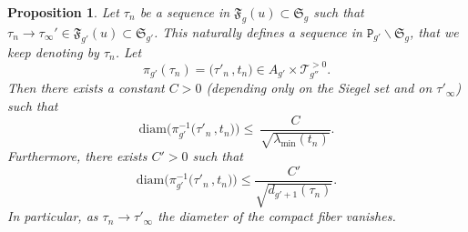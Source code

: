 \documentclass[10pt,a4paper]{amsart}
\newtheorem{proposition}{Proposition}
\newcommand{\cT}[1]{\mathscr{T}_{#1}^{\scriptscriptstyle{>0}}}
\newcommand{\diam}{\mathrm{diam}}
\newcommand{\fF}{\mathfrak{F}}
\newcommand{\fS}{\mathfrak{S}}
\newcommand{\tP}{\mathtt{P}}
\begin{document}
\begin{proposition}\label{pro:fiber.diam.est}
    Let $\tau_n$ be a sequence in $\fF_g(u)\subset \fS_g$ such that $\tau_n\to \tau_\infty'\in \fF_{g'}(u)\subset \fS_{g'}$. This naturally defines a sequence in $\tP_{g'}\backslash\fS_g$, that we keep denoting by $\tau_n$. Let
    \[
        \pi_{g'}(\tau_n)=\big(\tau'_n\,,t_n\big)\in A_{g'}\times\cT{g''}.
    \]
    Then there exists a constant $C>0$ (depending only on the Siegel set and on $\tau'_\infty$) such that
    \begin{equation}\label{eq:diam-lambda}
        \diam\big(\pi_{g'}^{-1}\big(\tau'_n\,,t_n\big)\big) \le\ \frac{C}{\sqrt{\lambda_{\min}(t_n)}}.
    \end{equation}
    Furthermore, there exists $C'>0$ such that
    \begin{equation}\label{eq:diam-dgplus1}
        \diam\big(\pi_{g'}^{-1}\big(\tau'_n\,,t_n\big)\big)\leq \frac{C'}{\sqrt{d_{g'+1}(\tau_n)}}.
    \end{equation}
    In particular, as $\tau_n\to \tau'_\infty$ the diameter of the compact fiber vanishes.
\end{proposition}
\end{document}
